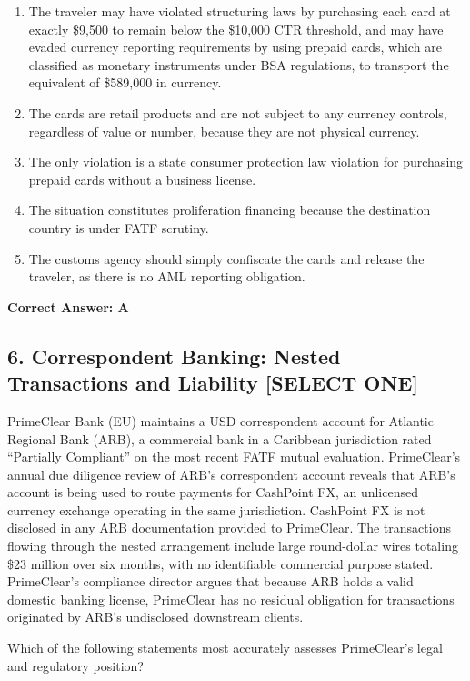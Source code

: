 \documentclass[11pt,a4paper]{article}
\begin{document}
	\begin{enumerate}[label=\Alph*.]
		\item The traveler may have violated structuring laws by purchasing each card at exactly \$9,500 to remain below the \$10,000 CTR threshold, and may have evaded currency reporting requirements by using prepaid cards, which are classified as monetary instruments under BSA regulations, to transport the equivalent of \$589,000 in currency.
		\item The cards are retail products and are not subject to any currency controls, regardless of value or number, because they are not physical currency.
		\item The only violation is a state consumer protection law violation for purchasing prepaid cards without a business license.
		\item The situation constitutes proliferation financing because the destination country is under FATF scrutiny.
		\item The customs agency should simply confiscate the cards and release the traveler, as there is no AML reporting obligation.
	\end{enumerate}
	\textbf{Correct Answer: A}
	
	\subsection{6. Correspondent Banking: Nested Transactions and Liability \textnormal{[SELECT ONE]}}
	
	PrimeClear Bank (EU) maintains a USD correspondent account for Atlantic Regional Bank (ARB), a commercial bank in a Caribbean jurisdiction rated ``Partially Compliant'' on the most recent FATF mutual evaluation. PrimeClear's annual due diligence review of ARB's correspondent account reveals that ARB's account is being used to route payments for CashPoint FX, an unlicensed currency exchange operating in the same jurisdiction. CashPoint FX is not disclosed in any ARB documentation provided to PrimeClear. The transactions flowing through the nested arrangement include large round-dollar wires totaling \$23 million over six months, with no identifiable commercial purpose stated. PrimeClear's compliance director argues that because ARB holds a valid domestic banking license, PrimeClear has no residual obligation for transactions originated by ARB's undisclosed downstream clients.
	
	Which of the following statements most accurately assesses PrimeClear's legal and regulatory position?
	
\end{document}
